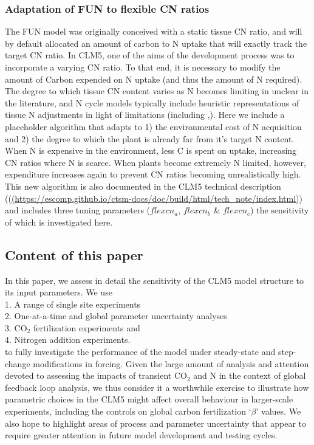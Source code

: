 \documentclass[draft,linenumbers]{agujournal}
\begin{document}
\subsubsection{Adaptation of FUN to flexible CN ratios}

The FUN model was originally conceived with a static tissue CN ratio, and will by default allocated an amount of carbon to N uptake that will exactly track the target CN ratio. In CLM5, one of the aims of the development process was to incorporate a varying CN ratio. To that end, it is necessary to modify the amount of Carbon expended on N uptake (and thus the amount of N required). The degree to which tissue CN content varies as N becomes limiting in unclear in the literature, and N cycle models typically include heuristic representations of tissue N adjustments in light of limitations (including \cite{zaehle2010},\cite{ghimire2016}). Here we include a placeholder algorithm that adapts to 1) the environmental cost of N acquisition and 2) the degree to which the plant is already far from it's target N content. When N is expensive in the environment, less C is spent on uptake, increasing CN ratios where N is scarce. When plants become extremely N limited, however, expenditure increases again to prevent CN ratios becoming unrealistically high. This new algorithm is also documented in the CLM5 technical description ((\url{(https://escomp.github.io/ctsm-docs/doc/build/html/tech_note/index.html)}) and includes three tuning parameters ($flexcn_{a}$, $flexcn_{b}$ \& $flexcn_{c}$) the sensitivity of which is investigated here.


\subsection{Content of this paper}

In this paper, we assess in detail the sensitivity of the CLM5 model structure to its input parameters. We use\\

1. A range of single site experiments \\

2. One-at-a-time and global parameter uncertainty analyses\\

3. CO$_{2}$ fertilization experiments and\\

4. Nitrogen addition experiments.\\

to fully investigate the performance of the model under steady-state and step-change modifications in forcing. Given the large amount of analysis and attention devoted to assessing the impacts of transient CO$_{2}$ and N in the context of global feedback loop analysis, we thus consider it a worthwhile exercise to illustrate how parametric choices in the CLM5 might affect overall behaviour in larger-scale experiments, including the controls on global carbon fertilization `$\beta$' values. We also hope to highlight areas of process and parameter uncertainty that appear to require greater attention in future model development and testing cycles. 
\end{document}
